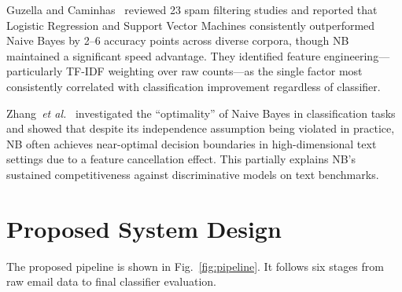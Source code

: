 \documentclass[conference,letterpaper]{IEEEtran}
\begin{document}
Guzella and Caminhas~\cite{guzella2009} reviewed 23 spam filtering studies and reported that
Logistic Regression and Support Vector Machines consistently outperformed Naive Bayes by 2--6
accuracy points across diverse corpora, though NB maintained a significant speed advantage.
They identified feature engineering---particularly TF-IDF weighting over raw counts---as the
single factor most consistently correlated with classification improvement regardless of classifier.

Zhang~\textit{et al.}~\cite{zhang2004} investigated the ``optimality'' of Naive Bayes in
classification tasks and showed that despite its independence assumption being violated in practice,
NB often achieves near-optimal decision boundaries in high-dimensional text settings due to a
feature cancellation effect. This partially explains NB's sustained competitiveness against
discriminative models on text benchmarks.

\section{Proposed System Design}
\label{sec:design}

The proposed pipeline is shown in Fig.~\ref{fig:pipeline}. It follows six stages from raw email
data to final classifier evaluation.
\end{document}
